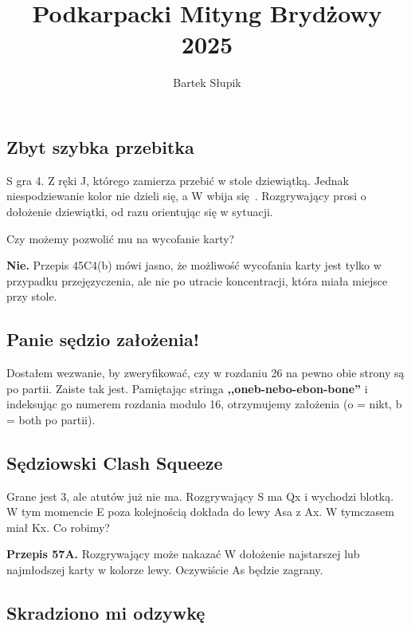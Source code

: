 \documentclass[12pt, a4paper]{article}
\title{Podkarpacki Mityng Brydżowy 2025}
\author{Bartek Słupik}
\newcounter{board}
\newcommand\nextboard{\stepcounter{board}\theboard}
\begin{document}
\maketitle

\subsection*{Zbyt szybka przebitka}
S gra 4\hearts. Z ręki \xspades J, którego zamierza przebić w stole dziewiątką.
Jednak niespodziewanie kolor nie dzieli się, a W wbija się . Rozgrywający prosi o dołożenie dziewiątki, od razu orientując 
się w sytuacji.

Czy możemy pozwolić mu na wycofanie karty?

\textbf{Nie.} Przepis 45C4(b) mówi jasno, że możliwość wycofania karty jest tylko w przypadku przejęzyczenia,
ale nie po utracie koncentracji, która miała miejsce przy stole.

\subsection*{Panie sędzio założenia!}
Dostałem wezwanie, by zweryfikować, czy w rozdaniu 26 na pewno 
obie strony są po partii. Zaiste tak jest. Pamiętając stringa
\textbf{,,oneb-nebo-ebon-bone''} i indeksując go numerem rozdania modulo 16,
otrzymujemy założenia (o = nikt, b = both po partii).

\subsection*{Sędziowski Clash Squeeze}
Grane jest 3\hearts\dbl, ale atutów już nie ma. Rozgrywający S ma
\xdiams Qx i wychodzi blotką. W tym momencie E poza kolejnością dokłada do lewy Asa z \xdiams Ax.
W tymczasem miał \xdiams Kx. Co robimy?

\textbf{Przepis 57A.} Rozgrywający może nakazać W dołożenie najstarszej 
lub najmłodszej karty w kolorze lewy. Oczywiście As będzie zagrany.


\subsection*{Skradziono mi odzywkę}

\handdiagramv[\nextboard]{\vhand{AJ5}{AQ9872}{-}{J543}}
				{}
                {}
                {}{}

\end{document}

